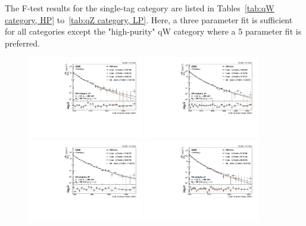 The F-test results for the single-tag category are listed in Tables~\ref{tab:qW category, HP} to~\ref{tab:qZ category, LP}.
Here, a three parameter fit is sufficient for all categories except the "high-purity" qW category where a 5 parameter fit is preferred.


\begin{figure}[htb]
\centering
\includegraphics[width=0.45\textwidth]{figures/analysis/search2/AN-16-235/plots/WWHP.pdf}
\includegraphics[width=0.45\textwidth]{figures/analysis/search2/AN-16-235/plots/WWLP.pdf}\\
\includegraphics[width=0.45\textwidth]{figures/analysis/search2/AN-16-235/plots/WZHP.pdf}
\includegraphics[width=0.45\textwidth]{figures/analysis/search2/AN-16-235/plots/WZLP.pdf}\\

\end{figure}
